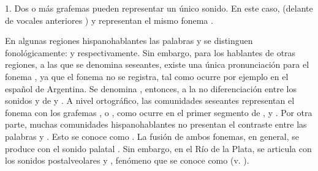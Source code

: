 \begin{ejercicio}
\begin{consignas}
\begin{exe}
          \ex {}
          \ex {}
        \end{exe}
        \begin{resuelto}
        1. Dos o más grafemas pueden representar un único sonido. En este caso,
         (delante de vocales anteriores  ) y 
        representan el mismo fonema .
        \end{resuelto}
\end{consignas}
\end{ejercicio}

\begin{recuadro}\label{rec:03-seseo}
En algunas regiones hispanohablantes las palabras  y 
se distinguen fonológicamente:  y  respectivamente.
Sin embargo, para los hablantes de otras regiones, a las que se denomina
seseantes, existe una única pronunciación para el fonema , ya que el
fonema  no se registra, tal como ocurre por ejemplo en el español de
Argentina. Se denomina , entonces, a la no diferenciación entre
los sonidos  y  de  y . A nivel
ortográfico, las comunidades seseantes representan el fonema  con los
grafemas ,  o , como ocurre en el primer segmento de
 ,   y 
. Por otra parte, muchas comunidades hispanohablantes no presentan
el contraste entre las palabras  y . Esto se conoce
como . La fusión de ambos fonemas, en general, se produce con el
sonido palatal . Sin embargo, en el Río de la Plata, se articula con los
sonidos postalveolares  y , fenómeno que se conoce como
 (v. ).
\end{recuadro}

